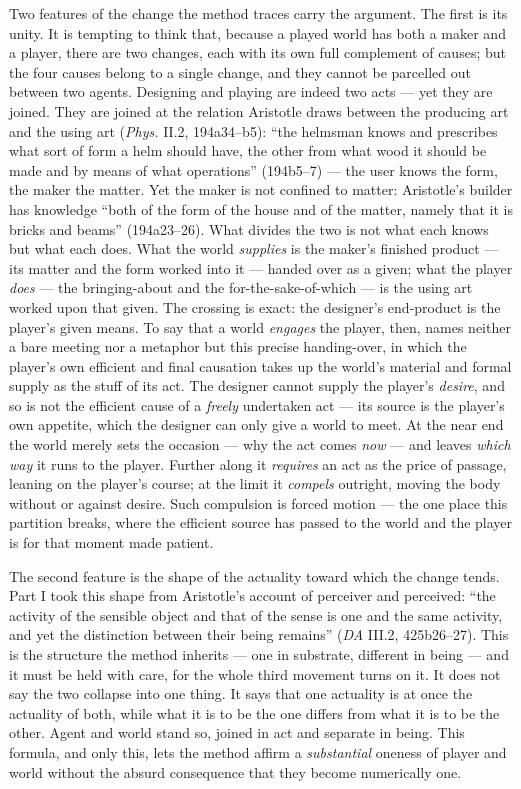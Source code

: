 \documentclass{article}
\begin{document}
Two features of the change the method traces carry the argument. The first is its unity. It is tempting to think that, because a played world has both a maker and a player, there are two changes, each with its own full complement of causes; but the four causes belong to a single change, and they cannot be parcelled out between two agents. Designing and playing are indeed two acts — yet they are joined. They are joined at the relation Aristotle draws between the producing art and the using art (\textit{Phys.} II.2, 194a34–b5): ``the helmsman knows and prescribes what sort of form a helm should have, the other from what wood it should be made and by means of what operations'' (194b5–7) — the user knows the form, the maker the matter. Yet the maker is not confined to matter: Aristotle's builder has knowledge ``both of the form of the house and of the matter, namely that it is bricks and beams'' (194a23–26). What divides the two is not what each knows but what each does. What the world \textit{supplies} is the maker's finished product — its matter and the form worked into it — handed over as a given; what the player \textit{does} — the bringing-about and the for-the-sake-of-which — is the using art worked upon that given. The crossing is exact: the designer's end-product is the player's given means. To say that a world \textit{engages} the player, then, names neither a bare meeting nor a metaphor but this precise handing-over, in which the player's own efficient and final causation takes up the world's material and formal supply as the stuff of its act. The designer cannot supply the player's \textit{desire}, and so is not the efficient cause of a \textit{freely} undertaken act — its source is the player's own appetite, which the designer can only give a world to meet. At the near end the world merely sets the occasion — why the act comes \textit{now} — and leaves \textit{which way} it runs to the player. Further along it \textit{requires} an act as the price of passage, leaning on the player's course; at the limit it \textit{compels} outright, moving the body without or against desire. Such compulsion is forced motion — the one place this partition breaks, where the efficient source has passed to the world and the player is for that moment made patient.

The second feature is the shape of the actuality toward which the change tends. Part I took this shape from Aristotle's account of perceiver and perceived: ``the activity of the sensible object and that of the sense is one and the same activity, and yet the distinction between their being remains'' (\textit{DA} III.2, 425b26–27). This is the structure the method inherits — one in substrate, different in being — and it must be held with care, for the whole third movement turns on it. It does not say the two collapse into one thing. It says that one actuality is at once the actuality of both, while what it is to be the one differs from what it is to be the other. Agent and world stand so, joined in act and separate in being. This formula, and only this, lets the method affirm a \textit{substantial} oneness of player and world without the absurd consequence that they become numerically one.
\end{document}
